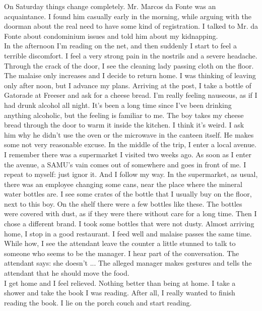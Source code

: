 \documentclass[11pt]{book}
\begin{document}
\noindent On Saturday things change completely. Mr. Marcos da Fonte was an acquaintance. I found him casually early in the morning, while arguing with the doorman about the real need to have some kind of registration. I talked to Mr. da Fonte about condominium issues and told him about my kidnapping. \\

\noindent In the afternoon I'm reading on the net, and then suddenly I start to feel a terrible discomfort. I feel a very strong pain in the nostrils and a severe headache. Through the crack of the door, I see the cleaning lady passing cloth on the floor. \\

\noindent The malaise only increases and I decide to return home. I was thinking of leaving only after noon, but I advance my plans. Arriving at the post, I take a bottle of Gatorade at Freeser and ask for a cheese bread. I'm really feeling nauseous, as if I had drunk alcohol all night. It's been a long time since I've been drinking anything alcoholic, but the feeling is familiar to me. The boy takes my cheese bread through the door to warm it inside the kitchen. I think it's weird. I ask him why he didn't use the oven or the microwave in the canteen itself. He makes some not very reasonable excuse. In the middle of the trip, I enter a local avenue. I remember there was a supermarket I visited two weeks ago. As soon as I enter the avenue, a SAMU's vain comes out of somewhere and goes in front of me. I repeat to myself: just ignor it. And I follow my way. In the supermarket, as usual, there was an employee changing some cans, near the place where the mineral water bottles are. I see some crates of the bottle that I usually buy on the floor, next to this boy. On the shelf there were a few bottles like these. The bottles were covered with dust, as if they were there without care for a long time. Then I chose a different brand. I took some bottles that were not dusty. Almost arriving home, I stop in a good restaurant. I feed well and malaise passes the same time. While how, I see the attendant leave the counter a little stunned to talk to someone who seems to be the manager. I hear part of the conversation. The attendant says: she doesn't ... The alleged manager makes gestures and tells the attendant that he should move the food.\\

\noindent I get home and I feel relieved. Nothing better than being at home. I take a shower and take the book I was reading. After all, I really wanted to finish reading the book. I lie on the porch couch and start reading. \\
\end{document}
